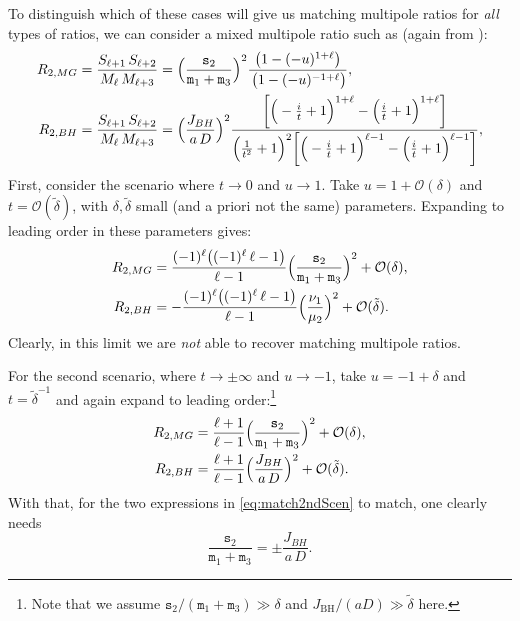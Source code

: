 \documentclass[12pt,a4paper]{article}
\newcommand{\mm}{\mathtt{m}}
\newcommand{\sm}{\mathtt{s}}
\begin{document}
To distinguish which of these cases will give us matching multipole ratios for \emph{all} types of ratios, we can consider a mixed multipole ratio such as (again from \cite{Bena:2020uup}):
\begin{align}
R_{2,MG}&=\frac{S_{\ell+1}\,S_{\ell+2}}{M_\ell\,M_{\ell+3}}=\Big(\frac{\sm_2}{\mm_1+\mm_3}\Big)^2\frac{\big(1-(-u)^{1+\ell}\big)}{\,\big(1-(-u)^{-1+\ell}\big)},\notag\\
\label{eq:mixedratios} R_{2,BH}&=\frac{S_{\ell+1}\,S_{\ell+2}}{M_\ell\,M_{\ell+3}}=\Big(\frac{J_{BH}}{a\,D}\Big)^2\frac{\bigg[\Big(-\frac{i}{t}+1\Big)^{1+\ell}-\Big(\frac{i}{t}+1\Big)^{1+\ell}\bigg]}{\Big(\frac{1}{t^2}+1\Big)^2\bigg[\Big(-\frac{i}{t}+1\Big)^{\ell-1}-\Big(\frac{i}{t}+1\Big)^{\ell-1}\bigg]},
\end{align}
First, consider the scenario where $t\rightarrow0$ and $u\rightarrow1$. Take $u=1+\mathcal{O}(\delta)$ and $t=\mathcal{O}(\tilde{\delta})$, with $\delta,\tilde\delta$ small (and a priori not the same) parameters. Expanding to leading order in these parameters gives:
\begin{align}
R_{2,MG}&=\frac{(-1)^\ell\big((-1)^\ell\,\ell-1\big)}{\ell-1}\Big(\frac{\sm_2}{\mm_1+\mm_3}\Big)^2+\mathcal{O}(\delta),\notag\\
R_{2,BH}&=-\frac{(-1)^\ell\big((-1)^\ell\,\ell-1\big)}{\ell-1}\Big(\frac{\nu_1}{\mu_2}\Big)^2+\mathcal{O}(\tilde{\delta}).
\end{align}
Clearly, in this limit we are \emph{not} able to recover matching multipole ratios.

For the second scenario, where $t\rightarrow\pm\infty$ and $u\rightarrow-1$, take $u=-1+\delta$ and $t=\tilde{\delta}^{-1}$ and again expand to leading order:\footnote{Note that we assume $\sm_2/(\mm_1+\mm_3)\gg\delta$ and $J_\text{BH}/(aD) \gg \tilde\delta$ here.}
\begin{align}
R_{2,MG}&=\frac{\ell+1}{\ell-1}\Big(\frac{\sm_2}{\mm_1+\mm_3}\Big)^2+\mathcal{O}(\delta),\notag\\
R_{2,BH}&=\frac{\ell+1}{\ell-1}\Big(\frac{J_{BH}}{a\,D}\Big)^2+\mathcal{O}(\tilde{\delta}).\label{eq:match2ndScen}
 \end{align}
With that, for the two expressions in \eqref{eq:match2ndScen} to match, one clearly needs
\begin{equation}
\frac{\sm_2}{\mm_1+\mm_3}=\pm\frac{J_{BH}}{a\,D}.\label{eq:angMomMatch}
\end{equation}
\end{document}
